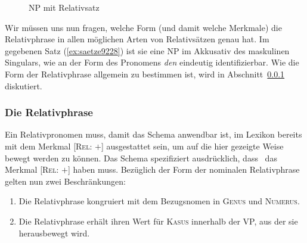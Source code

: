 \begin{figure}[!h]
  \centering
  \vspace{0.3cm}
  \caption{NP mit Relativsatz}
  \label{fig:saetze9228}
\end{figure}


Wir müssen uns nun fragen, welche Form (und damit welche Merkmale) die Relativphrase in allen möglichen Arten von Relativsätzen genau hat.
Im gegebenen Satz (\ref{ex:saetze9228}) ist sie eine NP im Akkusativ des maskulinen Singulars, wie an der Form des Pronomens \textit{den} eindeutig identifizierbar.
Wie die Form der Relativphrase allgemein zu bestimmen ist, wird in Abschnitt~\ref{sec:relativum} diskutiert.

\subsubsection{Die Relativphrase}

\label{sec:relativum}

Ein Relativpronomen muss, damit das Schema anwendbar ist, im Lexikon bereits mit dem Merkmal [\textsc{Rel}: $+$] ausgestattet sein, um auf die hier gezeigte Weise bewegt werden zu können.
Das Schema spezifiziert ausdrücklich, dass \Ti\ das Merkmal [\textsc{Rel}: $+$] haben muss.
Bezüglich der Form der nominalen Relativphrase gelten nun zwei Beschränkungen:

\begin{enumerate}\Lf
  \item Die Relativphrase kongruiert mit dem Bezugsnomen in \textsc{Genus} und \textsc{Numerus}.
  \item Die Relativphrase erhält ihren Wert für \textsc{Kasus} innerhalb der VP, aus der sie herausbewegt wird.
\end{enumerate}

